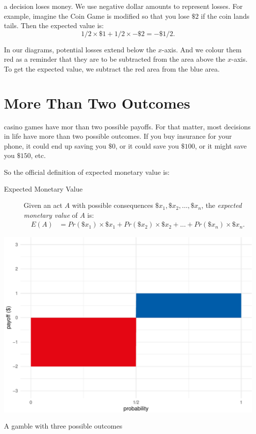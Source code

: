 \documentclass[justified]{tufte-book}
\newcommand{\p}{Pr}
\newcommand{\E}{E}
\theoremstyle{definition}
\theoremstyle{definition}
\theoremstyle{definition}
\theoremstyle{remark}
\begin{document}
 a decision loses money. We use negative dollar
amounts to represent losses. For example, imagine the Coin Game is
modified so that you lose \(\$2\) if the coin lands tails. Then the
expected value is: \[ 1/2 \times \$1 + 1/2 \times -\$2 = -\$1/2.\]

In our diagrams, potential losses extend below the \(x\)-axis. And we
colour them red as a reminder that they are to be subtracted from the
area above the \(x\)-axis. To get the expected value, we subtract the
red area from the blue area.

\hypertarget{more-than-two-outcomes}{%
\section{More Than Two Outcomes}\label{more-than-two-outcomes}}

 casino games have mor than two possible payoffs. For
that matter, most decisions in life have more than two possible
outcomes. If you buy insurance for your phone, it could end up saving
you \(\$0\), or it could save you \(\$100\), or it might save you
\(\$150\), etc.

So the official definition of expected monetary value is:

\begin{description}
\item[Expected Monetary Value]
Given an act \(A\) with possible consequences
\(\$x_1, \$x_2, \ldots, \$x_n\), the \emph{expected monetary value} of
\(A\) is: \[
  \begin{aligned}
\E(A) &= \p(\$x_1) \times \$x_1 + \p(\$x_2) \times \$x_2 + \ldots + \p(\$x_n) \times \$x_n.
  \end{aligned}
\]
\end{description}

\begin{marginfigure}
\includegraphics{_main_files/figure-latex/unnamed-chunk-91-1} \caption[A gamble with three possible outcomes]{A gamble with three possible outcomes}\label{fig:unnamed-chunk-91}
\end{marginfigure}
\end{document}
